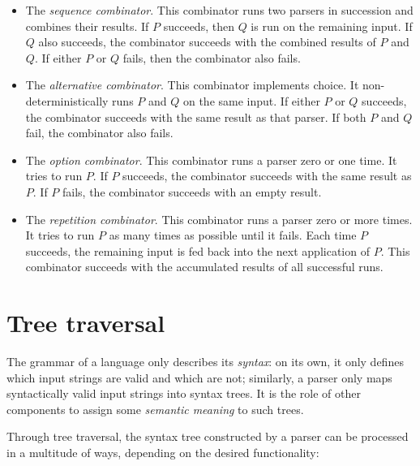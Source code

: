 \documentclass[UdineBachThesis,american,11pt]{PhdThesis}
\begin{document}
  \begin{itemize}
    \item The \emph{sequence combinator}. This combinator runs two parsers in
    succession and combines their results. If $P$ succeeds, then $Q$ is run on
    the remaining input. If $Q$ also succeeds, the combinator succeeds with the
    combined results of $P$ and $Q$\@. If either $P$ or $Q$ fails, then the
    combinator also fails.

    \item The \emph{alternative combinator}. This combinator implements choice.
    It non-de\-ter\-min\-is\-ti\-cal\-ly runs $P$ and $Q$ on the same input. If
    either $P$ or $Q$ succeeds, the combinator succeeds with the same result as
    that parser. If both $P$ and $Q$ fail, the combinator also fails.

    \item The \emph{option combinator}. This combinator runs a parser zero or
    one time. It tries to run $P$\@. If $P$ succeeds, the combinator succeeds
    with the same result as $P$\@. If $P$ fails, the combinator succeeds with an
    empty result.

    \item The \emph{repetition combinator}. This combinator runs a parser zero
    or more times. It tries to run $P$ as many times as possible until it fails.
    Each time $P$ succeeds, the remaining input is fed back into the next
    application of $P$\@. This combinator succeeds with the accumulated results
    of all successful runs.
  \end{itemize}

  \newpage

  \section{Tree traversal}

  The grammar of a language only describes its \emph{syntax}: on its own, it
  only defines which input strings are valid and which are not; similarly, a
  parser only maps syntactically valid input strings into syntax trees. It is
  the role of other components to assign some \emph{semantic meaning} to such
  trees.

  Through tree traversal, the syntax tree constructed by a parser can be
  processed in a multitude of ways, depending on the desired functionality:
\end{document}
